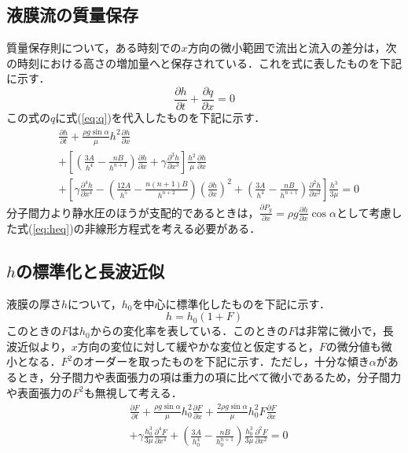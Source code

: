 \documentclass[autodetect-engine,dvipdfmx-if-dvi,ja=standard,a4paper,11pt]{bxjsarticle} %
\begin{document}
\subsection{液膜流の質量保存}
質量保存則について，ある時刻での$x$方向の微小範囲で流出と流入の差分は，次の時刻における高さの増加量へと保存されている．これを式に表したものを下記に示す．
\begin{equation}
\frac{\partial h}{\partial t}+\frac{\partial q}{\partial x}=0
\end{equation}
この式の$q$に式(\ref{eq:q})を代入したものを下記に示す．
\begin{equation}
\begin{split}
&\frac{\partial h}{\partial t}+\frac{\rho g\sin\alpha}{\mu}h^2\frac{\partial h}{\partial x}\\
&+\left[\left(\frac{3A}{h^4}-\frac{nB}{h^{n+1}}\right)\frac{\partial h}{\partial x}+\gamma\frac{\partial^3 h}{\partial x^3}\right]\frac{h^2}{\mu}\frac{\partial h}{\partial x}\\
&+\left[\gamma\frac{\partial^4 h}{\partial x^4}-\left(\frac{12A}{h^5}-\frac{n(n+1)B}{h^{n+2}}\right)\left(\frac{\partial h}{\partial x}\right)^2+\left(\frac{3A}{h^4}-\frac{nB}{h^{n+1}}\right)\frac{\partial^2 h}{\partial x^2}\right]\frac{h^3}{3\mu}=0
\label{eq:heq}
\end{split}
\end{equation}
分子間力より静水圧のほうが支配的であるときは，$\frac{\partial P_y}{\partial x}=\rho g\frac{\partial h}{\partial x}\cos\alpha$として考慮した式(\ref{eq:heq})の非線形方程式を考える必要がある．

\subsection{$h$の標準化と長波近似}
液膜の厚さ$h$について，$h_0$を中心に標準化したものを下記に示す．
\begin{equation}
h=h_0(1+F)
\end{equation}
このときの$F$は$h_0$からの変化率を表している．このときの$F$は非常に微小で，長波近似より，$x$方向の変位に対して緩やかな変位と仮定すると，$F$の微分値も微小となる．$F^2$のオーダーを取ったものを下記に示す．ただし，十分な傾き$\alpha$があるとき，分子間力や表面張力の項は重力の項に比べて微小であるため，分子間力や表面張力の$F^2$も無視して考える．
\begin{equation}
\begin{split}
&\frac{\partial F}{\partial t}+\frac{\rho g\sin\alpha}{\mu}h_0^2\frac{\partial F}{\partial x}+\frac{2\rho g\sin\alpha}{\mu}h_0^2F\frac{\partial F}{\partial x}\\
&+\gamma\frac{h_0^3}{3\mu}\frac{\partial^4 F}{\partial x^4}+\left(\frac{3A}{h_0^4}-\frac{nB}{h_0^{n+1}}\right)\frac{h_0^3}{3\mu}\frac{\partial^2 F}{\partial x^2}=0
\label{eq:Feq}
\end{split}
\end{equation}
\end{document}
